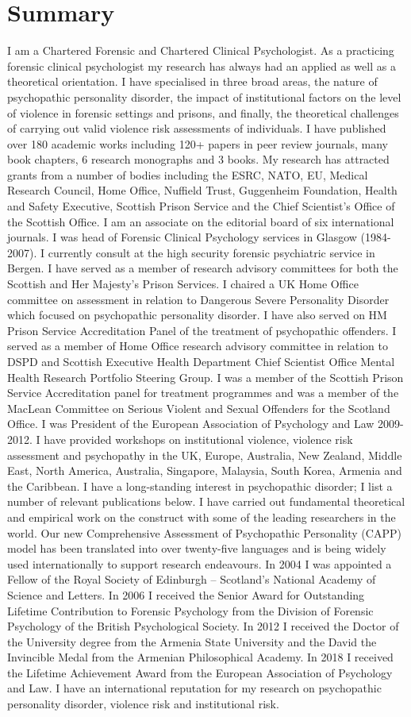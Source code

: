 \documentclass [a4paper,10pt]{article}
\begin{document}
\section{Summary}
I am a Chartered Forensic and Chartered Clinical Psychologist. As a practicing forensic clinical psychologist my research has always had an applied as well as a theoretical orientation. I have specialised in three broad areas, the nature of psychopathic personality disorder, the impact of institutional factors on the level of violence in forensic settings and prisons, and finally, the theoretical challenges of carrying out valid violence risk assessments of individuals. I have published over 180 academic works including 120+ papers in peer review journals, many book chapters, 6 research monographs and 3 books. My research has attracted grants from a number of bodies including the ESRC, NATO, EU, Medical Research Council, Home Office, Nuffield Trust, Guggenheim Foundation, Health and Safety Executive, Scottish Prison Service and the Chief Scientist's Office of the Scottish Office. I am an associate on the editorial board of six international journals. I was head of Forensic Clinical Psychology services in Glasgow (1984-2007). I currently consult at the high security forensic psychiatric service in Bergen. I have served as a member of research advisory committees for both the Scottish and Her Majesty's Prison Services. I chaired a UK Home Office committee on assessment in relation to Dangerous Severe Personality Disorder which focused on psychopathic personality disorder. I have also served on HM Prison Service Accreditation Panel of the treatment of psychopathic offenders. I served as a member of Home Office research advisory committee in relation to DSPD and Scottish Executive Health Department Chief Scientist Office Mental Health Research Portfolio Steering Group. I was a member of the Scottish Prison Service Accreditation panel for treatment programmes and was a member of the MacLean Committee on Serious Violent and Sexual Offenders for the Scotland Office. I was President of the European Association of Psychology and Law 2009-2012. I have provided workshops on institutional violence, violence risk assessment and psychopathy in the UK, Europe, Australia, New Zealand, Middle East, North America, Australia, Singapore, Malaysia, South Korea, Armenia and the Caribbean. I have a long-standing interest in psychopathic disorder; I list a number of relevant publications below. I have carried out fundamental theoretical and empirical work on the construct with some of the leading researchers in the world. Our new Comprehensive Assessment of Psychopathic Personality (CAPP) model has been translated into over twenty-five languages and is being widely used internationally to support research endeavours. In 2004 I was appointed a Fellow of the Royal Society of Edinburgh – Scotland’s National Academy of Science and Letters. In 2006 I received the Senior Award for Outstanding Lifetime Contribution to Forensic Psychology from the Division of Forensic Psychology of the British Psychological Society. In 2012 I received the Doctor of the University degree from the Armenia State University and the David the Invincible Medal from the Armenian Philosophical Academy. In 2018 I received the Lifetime Achievement Award from the European Association of Psychology and Law. I have an international reputation for my research on psychopathic personality disorder, violence risk and institutional risk.
\end{document}
